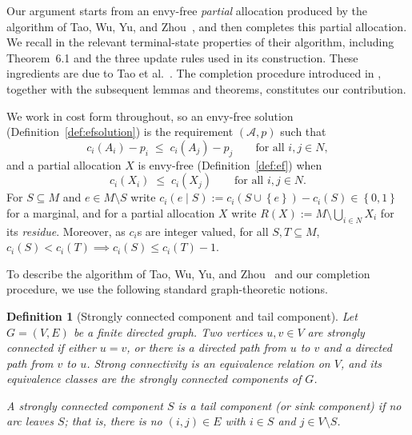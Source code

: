 \documentclass[sigconf,anonymous]{aamas}
\newcommand{\agents}{N}
\newcommand{\items}{M}
\newcommand{\bundle}[1]{A_{#1}}
\newcommand{\subsidy}{p}
\newcommand{\cost}{c}
\newcommand{\set}[1]{\left\{#1\right\}}
\theoremstyle{acmplain}
\theoremstyle{acmdefinition}
\newtheorem{definition}[theorem]{Definition}
\theoremstyle{acmplain}
\begin{document}
Our argument starts from an envy-free \emph{partial} allocation produced by the algorithm of Tao, Wu, Yu, and Zhou~\cite{tao2025existence}, and then completes this partial allocation. We recall in  the relevant terminal-state properties of their algorithm, including Theorem~6.1 and the three update rules used in its construction. These ingredients are due to Tao et al.~\cite{tao2025existence}. The completion procedure introduced in , together with the subsequent lemmas and theorems, constitutes our contribution.


We work in cost form throughout, so an envy-free solution (Definition~\ref{def:efsolution}) is the requirement $(\mathcal{A},p)$ such that
\begin{equation} \label{eq:m-ef}
  \cost_i(\bundle i) - \subsidy_i \;\le\; \cost_i(\bundle j) - \subsidy_j  \qquad \text{for all } i,j \in \agents ,
\end{equation} 
and a partial allocation $X$ is envy-free (Definition~\ref{def:ef}) when
\begin{equation} \label{eq:m-pef}
  \cost_i(X_i) \;\le\; \cost_i(X_j)
  \qquad \text{for all } i,j \in \agents .
\end{equation}
For $S \subseteq \items$ and $e \in \items \setminus S$ write $\cost_i(e \mid S) := \cost_i(S \cup \set e) - \cost_i(S) \in \set{0,1}$ for a marginal, and for a partial allocation $X$ write $R(X) := \items \setminus \bigcup_{i \in \agents} X_i$ for its \emph{residue}.  Moreover, as $\cost_i$s are integer valued, for all $S,T\subseteq M$, \(\cost_i(S) < \cost_i(T) \implies \cost_i(S) \le \cost_i(T) - 1 .
 \)

To describe the algorithm of Tao, Wu, Yu, and Zhou~\cite{tao2025existence} and our completion procedure, we use the following standard graph-theoretic notions.

\begin{definition}[Strongly connected component and tail component]
\label{def:scc}
Let $G=(V,E)$ be a finite directed graph. Two vertices \(u,v\in V\) are \emph{strongly connected} if either \(u=v\), or there is a directed path from \(u\) to \(v\) and a directed path from \(v\) to \(u\). Strong connectivity is an equivalence relation on $V$, and its equivalence classes are the \emph{strongly connected components} of $G$.

A strongly connected component $S$ is a \emph{tail component} (or \emph{sink component}) if no arc leaves $S$; that is, there is no $(i,j)\in E$ with $i\in S$ and $j\in V\setminus S$.
\end{definition}
\end{document}
